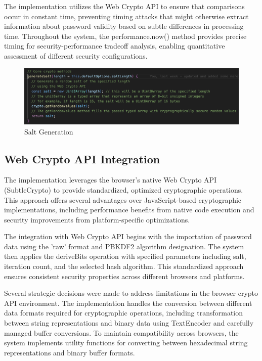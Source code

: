 \documentclass[11pt,a4paper]{article}
\begin{document}
The implementation utilizes the Web Crypto API to ensure that comparisons occur in constant time, preventing timing attacks that might otherwise extract information about password validity based on subtle differences in processing time. Throughout the system, the performance.now() method provides precise timing for security-performance tradeoff analysis, enabling quantitative assessment of different security configurations.
\begin{figure}[htbp]
  \centering
  \includegraphics[width=1\linewidth]{images/Salt.png}
  \caption{Salt Generation}
  \label{fig:your-label}
\end{figure}
\subsection{Web Crypto API Integration}
The implementation leverages the browser's native Web Crypto API (SubtleCrypto) to provide standardized, optimized cryptographic operations. This approach offers several advantages over JavaScript-based cryptographic implementations, including performance benefits from native code execution and security improvements from platform-specific optimizations.

The integration with Web Crypto API begins with the importation of password data using the 'raw' format and PBKDF2 algorithm designation. The system then applies the deriveBits operation with specified parameters including salt, iteration count, and the selected hash algorithm. This standardized approach ensures consistent security properties across different browsers and platforms.

Several strategic decisions were made to address limitations in the browser crypto API environment. The implementation handles the conversion between different data formats required for cryptographic operations, including transformation between string representations and binary data using TextEncoder and carefully managed buffer conversions. To maintain compatibility across browsers, the system implements utility functions for converting between hexadecimal string representations and binary buffer formats.
\end{document}
